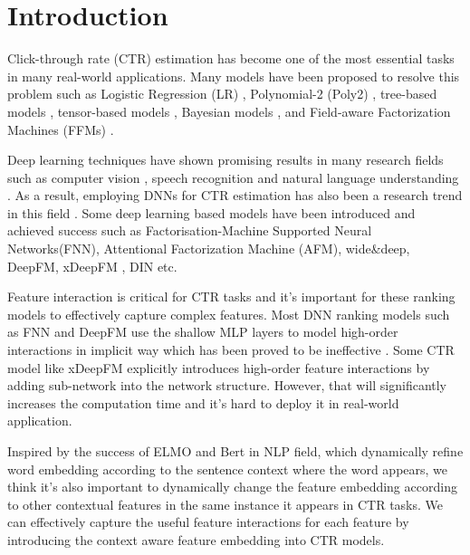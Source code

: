 \documentclass[sigconf]{acmart}
\begin{document}
\maketitle

\section{Introduction}
Click-through rate (CTR) estimation has become one of the most essential tasks in many real-world applications. Many models have been proposed to resolve this problem such as Logistic Regression (LR) \cite{10.1145/2487575.2488200}, Polynomial-2 (Poly2) \cite{rendle2010factorization}, tree-based models \cite{he2014practical}, tensor-based models \cite{koren2009matrix}, Bayesian models \cite{graepel2010web}, and Field-aware Factorization Machines (FFMs) \cite{juan2016field}.


Deep learning techniques have shown promising results in many research fields such as computer vision \cite{krizhevsky2012imagenet, he2016deep}, speech recognition \cite{graves2013speech,tang2017end} and natural language understanding \cite{cho2014learning,mikolov2010recurrent}. As a result, employing DNNs for CTR estimation has also been a research trend in this field \cite{zhang2016deep,cheng2016wide,xiao2017attentional,guo2017deepfm,lian2018xdeepfm,qu2016product,wang2017deep}. Some deep learning based models have been introduced and achieved success such as Factorisation-Machine Supported Neural Networks(FNN)\cite{zhang2016deep}, Attentional Factorization Machine (AFM)\cite{cheng2016wide}, wide\&deep\cite{xiao2017attentional}, DeepFM\cite{guo2017deepfm}, xDeepFM \cite{lian2018xdeepfm}, DIN\cite{zhou2018deep} etc.


Feature interaction is critical for CTR tasks and it’s important for these ranking models to effectively capture  complex features. Most DNN ranking models such as FNN and DeepFM use the shallow MLP layers to model high-order interactions in implicit way which has been proved to be ineffective \cite{beutel2018latent}. Some CTR model like xDeepFM \cite{lian2018xdeepfm}  explicitly introduces high-order feature interactions by adding sub-network into the network structure. However, that will  significantly increases the computation time and it's hard to deploy it in real-world application.



Inspired by the success of  ELMO\cite{peters2018deep} and Bert\cite{devlin2018bert} in NLP field, which  dynamically refine word embedding according to the sentence context where the word appears, we think it's also important to dynamically change the feature embedding according to other contextual features in the same instance it appears in CTR tasks. We can effectively capture the useful feature interactions for each feature by introducing the context aware feature embedding into CTR models.
\end{document}
